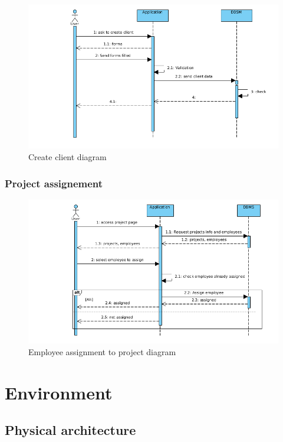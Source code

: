 \documentclass[12pt,a4paper,table,english]{article}
\begin{document}
	\begin{figure}[H]
		\includegraphics[width=150mm]{Image/seq-createclient}
		\caption{Create client diagram}
		\label{fig:Create client diagram}
	\end{figure}

	\subsubsection{Project assignement}

	\begin{figure}[H]
		\includegraphics[width=150mm]{Image/seq-assigntoproject}
		\caption{Employee assignment to project diagram}
		\label{fig:Employee assignement to project diagram}
	\end{figure}


	\newpage
		
	\section{Environment}
	
	\subsection{Physical architecture}
	
\end{document}
